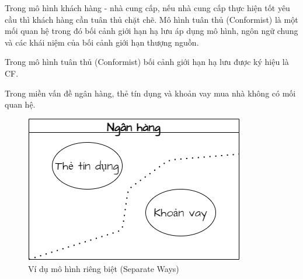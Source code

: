 Trong mô hình khách hàng - nhà cung cấp, nếu nhà cung cấp thực hiện tốt yêu cầu  thì     khách hàng    cần tuân thủ chặt chẽ. Mô hình tuân thủ (Conformist)    là một mối quan hệ trong đó bối cảnh giới hạn hạ lưu áp dụng mô hình, ngôn ngữ chung và các khái niệm  của  bối cảnh giới hạn thượng nguồn. 

Trong mô hình   tuân thủ (Conformist)    bối cảnh giới hạn hạ lưu  được ký hiệu là  CF.



 




\begin{example} Trong miền vấn đề ngân hàng,     thẻ tín dụng và khoản vay mua nhà không có mối quan hệ. 
    
    \begin{figure}[H]
        
        \centering
        
        \includegraphics[scale = 0.5]{pictures/mo_hinh_rieng_biet_separate_ways/main.drawio.png}
        
        \caption{Ví dụ  mô hình riêng biệt (Separate Ways)  }
        
    \end{figure}
\end{example} 

